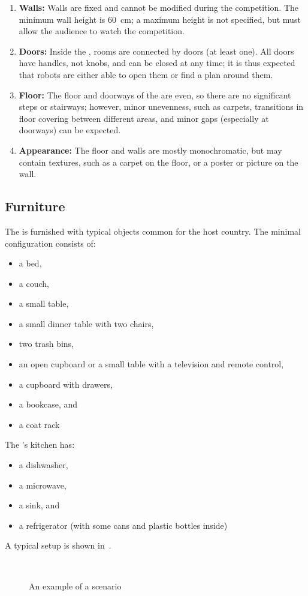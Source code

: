 \begin{enumerate}
	\item \textbf{Walls:} Walls are fixed and cannot be modified during the competition. The minimum wall height is \SI{60}{\centi\meter}; a maximum height is not specified, but must allow the audience to watch the competition.
	\item \textbf{Doors:} Inside the \Arena{}, rooms are connected by doors (at least one). All doors have handles, not knobs, and can be closed at any time; it is thus expected that robots are either able to open them or find a plan around them.
	\item \textbf{Floor:} The floor and doorways of the \Arena{} are even, so there are no significant steps or stairways; however, minor unevenness, such as carpets, transitions in floor covering between different areas, and minor gaps (especially at doorways) can be expected.
	\item \textbf{Appearance:} The floor and walls are mostly monochromatic, but may contain textures, such as a carpet on the floor, or a poster or picture on the wall.
\end{enumerate}


\subsection{Furniture}
\label{rule:scenario_furniture}

The \Arena{} is furnished with typical objects common for the host country.
The minimal configuration consists of:
\begin{itemize}
	\item a bed,
	\item a couch,
	\item a small table,
	\item a small dinner table with two chairs,
	\item two trash bins,
	\item an open cupboard or a small table with a television and remote control,
	\item a cupboard with drawers,
	\item a bookcase, and
	\item a coat rack
\end{itemize}
The \Arena{}'s kitchen has:
\begin{itemize}
	\item a dishwasher,
	\item a microwave,
	\item a sink, and
	\item a refrigerator (with some cans and plastic bottles inside)
\end{itemize}
A typical \Arena{} setup is shown in~.
\begin{figure}[tbp]
	\centering
	 ~
	\caption{An example of a \RoboCup\AtHome scenario}
	\label{fig:arena}
\end{figure}

